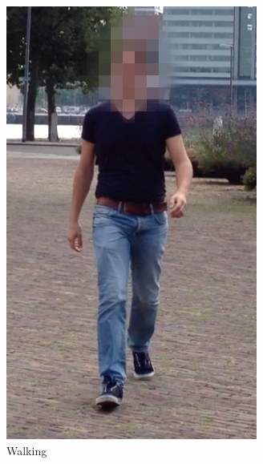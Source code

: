\begin{figure}
\begin{subfigure}[b]{0.2\textwidth}
    \includegraphics[width=\textwidth]{./Figures/chapter6/data_collection/stills/roemer_walk.png}
    \caption{Walking}
    \label{fig:stills_subject_1_walking}
  \end{subfigure}
  \qquad \qquad \qquad
  \begin{subfigure}[b]{0.2\textwidth}

\end{subfigure}
\end{figure}
